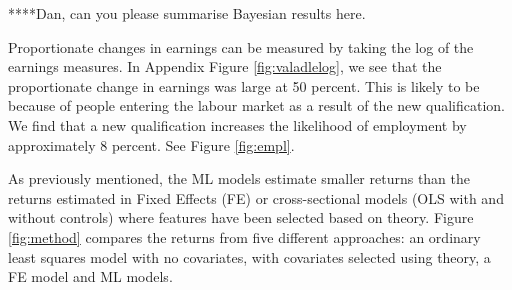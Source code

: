 \documentclass[12pt, a4paper]{article}
\begin{document}
****Dan, can you please summarise Bayesian results here.

%
%

Proportionate changes in earnings can be measured by taking the log of the earnings measures. In Appendix Figure \ref{fig:valadlelog}, we see that the proportionate change in earnings was large at 50 percent. This is likely to be because of people entering the labour market as a result of the new qualification. We find that a new qualification increases the likelihood of employment by approximately 8 percent. See Figure \ref{fig:empl}.

As previously mentioned, the ML models estimate smaller returns than the returns estimated in Fixed Effects (FE) or cross-sectional models (OLS with and without controls) where features have been selected based on theory. Figure \ref{fig:method} compares the returns from five different approaches: an ordinary least squares model with no covariates, with covariates selected using theory, a FE model and ML models.

%
\end{document}
